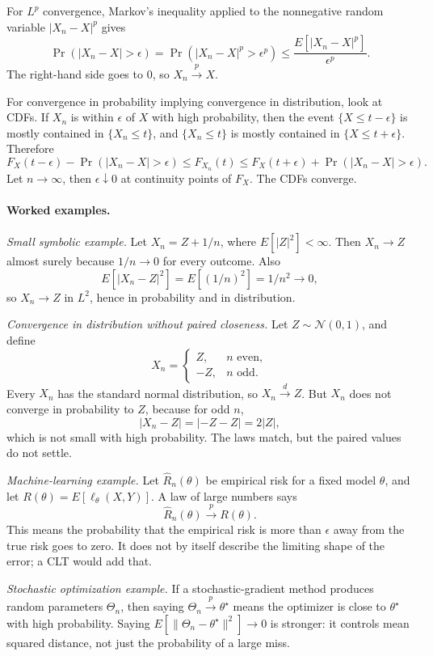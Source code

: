 For \(L^p\) convergence, Markov's inequality applied to the nonnegative random variable \(|X_n-X|^p\) gives
\[
\Pr(|X_n-X|>\epsilon)
=
\Pr(|X_n-X|^p>\epsilon^p)
\leq
\frac{E[|X_n-X|^p]}{\epsilon^p}.
\]
The right-hand side goes to \(0\), so \(X_n\xrightarrow{p}X\).

For convergence in probability implying convergence in distribution, look at CDFs. If \(X_n\) is within \(\epsilon\) of \(X\) with high probability, then the event \(\{X\leq t-\epsilon\}\) is mostly contained in \(\{X_n\leq t\}\), and \(\{X_n\leq t\}\) is mostly contained in \(\{X\leq t+\epsilon\}\). Therefore
\[
F_X(t-\epsilon)-\Pr(|X_n-X|>\epsilon)
\leq F_{X_n}(t)
\leq F_X(t+\epsilon)+\Pr(|X_n-X|>\epsilon).
\]
Let \(n\to\infty\), then \(\epsilon\downarrow0\) at continuity points of \(F_X\). The CDFs converge.

\paragraph{Worked examples.}
\emph{Small symbolic example.}
Let \(X_n=Z+1/n\), where \(E[|Z|^2]<\infty\). Then \(X_n\to Z\) almost surely because \(1/n\to0\) for every outcome. Also
\[
E[|X_n-Z|^2]=E[(1/n)^2]=1/n^2\to0,
\]
so \(X_n\to Z\) in \(L^2\), hence in probability and in distribution.

\emph{Convergence in distribution without paired closeness.}
Let \(Z\sim\mathcal N(0,1)\), and define
\[
X_n=
\begin{cases}
Z, & n\text{ even},\\
-Z, & n\text{ odd}.
\end{cases}
\]
Every \(X_n\) has the standard normal distribution, so \(X_n\xrightarrow{d}Z\). But \(X_n\) does not converge in probability to \(Z\), because for odd \(n\),
\[
|X_n-Z|=|-Z-Z|=2|Z|,
\]
which is not small with high probability. The laws match, but the paired values do not settle.

\emph{Machine-learning example.}
Let \(\hat R_n(\theta)\) be empirical risk for a fixed model \(\theta\), and let \(R(\theta)=E[\ell_\theta(X,Y)]\). A law of large numbers says
\[
\hat R_n(\theta)\xrightarrow{p}R(\theta).
\]
This means the probability that the empirical risk is more than \(\epsilon\) away from the true risk goes to zero. It does not by itself describe the limiting shape of the error; a CLT would add that.

\emph{Stochastic optimization example.}
If a stochastic-gradient method produces random parameters \(\Theta_n\), then saying \(\Theta_n\xrightarrow{p}\theta^\star\) means the optimizer is close to \(\theta^\star\) with high probability. Saying \(E[\|\Theta_n-\theta^\star\|^2]\to0\) is stronger: it controls mean squared distance, not just the probability of a large miss.

